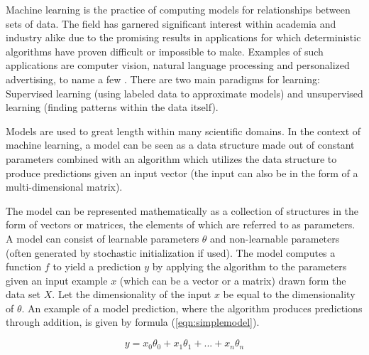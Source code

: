 Machine learning is the practice of computing models for relationships between sets of data. The field has garnered significant interest within academia and industry alike due to the promising results in applications for which deterministic algorithms have proven difficult or impossible to make. Examples of such applications are computer vision, natural language processing and personalized advertising, to name a few \cite{sebe2005machine, allen2003natural, malheiros2012too}. There are two main paradigms for learning: Supervised learning (using labeled data to approximate models) and unsupervised learning (finding patterns within the data itself). 

Models are used to great length within many scientific domains. In the context of machine learning, a model can be seen as a data structure made out of constant parameters combined with an algorithm which utilizes the data structure to produce predictions given an input vector (the input can also be in the form of a multi-dimensional matrix). 

The model can be represented mathematically as a collection of structures in the form of vectors or matrices, the elements of which are referred to as parameters. A model can consist of learnable parameters $\theta$ and non-learnable parameters (often generated by stochastic initialization if used). The model computes a function $f$ to yield a prediction $y$ by applying the algorithm to the parameters given an input example $x$ (which can be a vector or a matrix) drawn form the data set $X$. Let the dimensionality of the input $x$ be equal to the dimensionality of $\theta$. An example of a model prediction, where the algorithm produces predictions through addition, is given by formula (\ref{eqn:simplemodel}).

\begin{equation}
\label{eqn:simplemodel}
 y = x_0\theta_0 + x_1\theta_1 + ... + x_n\theta_n
\end{equation}

